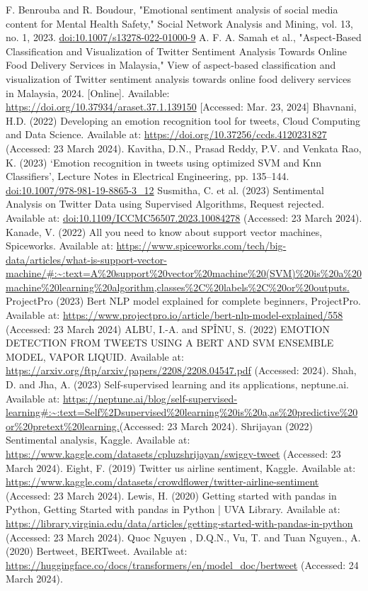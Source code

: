 \documentclass[conference]{IEEEtran}
\begin{document}
\begin{thebibliography}{00}
 F. Benrouba and R. Boudour, "Emotional sentiment analysis of social media content for Mental Health Safety," Social Network Analysis and Mining, vol. 13, no. 1, 2023. \url{doi:10.1007/s13278-022-01000-9}
 A. F. A. Samah et al., "Aspect-Based Classification and Visualization of Twitter Sentiment Analysis Towards Online Food Delivery Services in Malaysia," View of aspect-based classification and visualization of Twitter sentiment analysis towards online food delivery services in Malaysia, 2024. [Online]. Available: \url{https://doi.org/10.37934/araset.37.1.139150} [Accessed: Mar. 23, 2024]
 Bhavnani, H.D. (2022) Developing an emotion recognition tool for tweets, Cloud Computing and Data Science. Available at: \url{https://doi.org/10.37256/ccds.4120231827} (Accessed: 23 March 2024). 
 Kavitha, D.N., Prasad Reddy, P.V. and Venkata Rao, K. (2023) ‘Emotion recognition in tweets using optimized SVM and Knn Classifiers’, Lecture Notes in Electrical Engineering, pp. 135–144. \url{doi:10.1007/978-981-19-8865-3_12}
Susmitha, C. et al. (2023) Sentimental Analysis on Twitter Data using Supervised Algorithms, Request rejected. Available at: \url{doi:10.1109/ICCMC56507.2023.10084278} (Accessed: 23 March 2024).
 Kanade, V. (2022) All you need to know about support vector machines, Spiceworks. Available at: \url{https://www.spiceworks.com/tech/big-data/articles/what-is-support-vector-machine/#:~:text=A%20support%20vector%20machine%20(SVM)%20is%20a%20machine%20learning%20algorithm,classes%2C%20labels%2C%20or%20outputs.}
 ProjectPro (2023) Bert NLP model explained for complete beginners, ProjectPro. Available at: \url{https://www.projectpro.io/article/bert-nlp-model-explained/558} (Accessed: 23 March 2024)
 ALBU, I.-A. and SPÎNU, S. (2022) EMOTION DETECTION FROM TWEETS USING A BERT AND SVM ENSEMBLE MODEL, VAPOR LIQUID. Available at: \url{https://arxiv.org/ftp/arxiv/papers/2208/2208.04547.pdf} (Accessed: 2024). 
 Shah, D. and Jha, A. (2023) Self-supervised learning and its applications, neptune.ai. Available at: \url{https://neptune.ai/blog/self-supervised-learning#:~:text=Self%2Dsupervised%20learning%20is%20a,as%20predictive%20or%20pretext%20learning.}(Accessed: 23 March 2024). 
 Shrijayan (2022) Sentimental analysis, Kaggle. Available at: \url{ https://www.kaggle.com/datasets/cpluzshrijayan/swiggy-tweet} (Accessed: 23 March 2024).  
 Eight, F. (2019) Twitter us airline sentiment, Kaggle. Available at: \url{https://www.kaggle.com/datasets/crowdflower/twitter-airline-sentiment} (Accessed: 23 March 2024). 
 Lewis, H. (2020) Getting started with pandas in Python, Getting Started with pandas in Python | UVA Library. Available at: \url{https://library.virginia.edu/data/articles/getting-started-with-pandas-in-python} (Accessed: 23 March 2024). 
 Quoc Nguyen , D.Q.N.,  Vu, T. and Tuan Nguyen., A. (2020) Bertweet, BERTweet. Available at: \url{https://huggingface.co/docs/transformers/en/model_doc/bertweet} (Accessed: 24 March 2024). 
\end{thebibliography}
\end{document}
